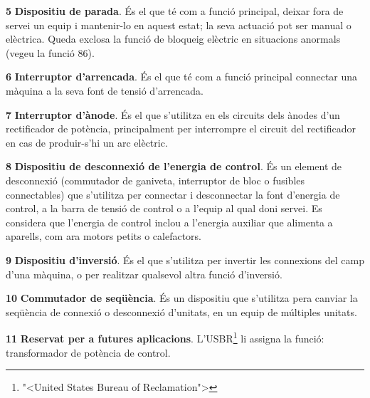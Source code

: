 \begin{multicols}{2}
\begin{list}{}
\item[\textbf{5}]   \textbf{Dispositiu de parada}. \'{E}s el que
t\'{e} com a funci\'{o} principal, deixar fora de servei un equip i
mantenir-lo en aquest estat; la seva actuaci\'{o} pot ser manual o
el\`{e}ctrica. Queda exclosa la funci\'{o} de bloqueig el\`{e}ctric en
situacions anormals (vegeu la funci\'{o} 86).

\item[\textbf{6}]  \textbf{Interruptor d'arrencada}. \'{E}s
el que t\'{e} com a funci\'{o} principal connectar una m\`{a}quina a la seva font de tensi\'{o} d'arrencada.

\item[\textbf{7}]  \textbf{Interruptor d'\`{a}node}. \'{E}s el que
s'utilitza en els circuits dels \`{a}nodes d'un rectificador de
pot\`{e}ncia, principalment per interrompre el circuit del rectificador
en  cas de produir-s'hi un arc el\`{e}ctric.

\item[\textbf{8}]  \textbf{Dispositiu de desconnexi\'{o} de l'energia
de control}. \'{E}s un element de desconnexi\'{o} (commutador de ganiveta,
interruptor de bloc o fusibles connectables) que s'utilitza per
connectar i desconnectar la font d'energia de control,  a la barra
de tensi\'{o} de control o a l'equip al qual doni servei. Es considera
que l'energia de control inclou a l'energia auxiliar que alimenta a
aparells, com ara motors petits o calefactors.

\item[\textbf{9}]  \textbf{Dispositiu d'inversi\'{o}}. \'{E}s el
que s'utilitza per invertir les connexions del camp d'una m\`{a}quina, o
per realitzar qualsevol altra funci\'{o}  d'inversi\'{o}.

\item[\textbf{10}]  \textbf{Commutador de seq\"{u}\`{e}ncia}. \'{E}s un
dispositiu que s'utilitza pera canviar la seq\"{u}\`{e}ncia de connexi\'{o} o
desconnexi\'{o} d'unitats, en un equip de m\'{u}ltiples unitats.

\item[\textbf{11}] \textbf{Reservat per a  futures aplicacions}.
L'\textsf{USBR}\footnote{{"<}United States Bureau of Reclamation{">}}
 li assigna la funci\'{o}: transformador de pot\`{e}ncia de control.


\end{list}
\end{multicols}
